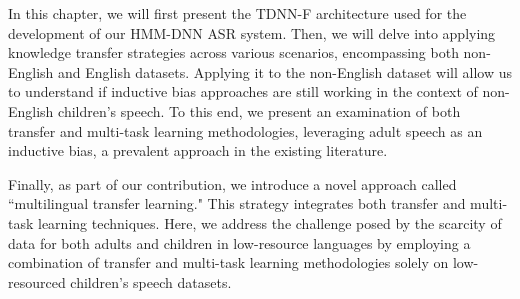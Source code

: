 In this chapter, we will first present the \ac{TDNN-F} architecture used for the development of our \ac{HMM-DNN} \ac{ASR} system. Then, we will delve into applying knowledge transfer strategies across various scenarios, encompassing both non-English and English datasets. Applying it to the non-English dataset will allow us to understand if inductive bias approaches are still working in the context of non-English children's speech. To this end, we present an examination of both transfer and multi-task learning methodologies, leveraging adult speech as an inductive bias, a prevalent approach in the existing literature. 

Finally, as part of our contribution, we introduce a novel approach called ``multilingual transfer learning." This strategy integrates both transfer and multi-task learning techniques. Here, we address the challenge posed by the scarcity of data for both adults and children in low-resource languages by employing a combination of transfer and multi-task learning methodologies solely on low-resourced children's speech datasets.

